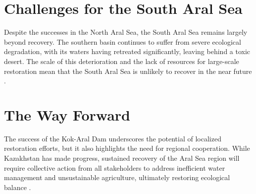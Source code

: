 \section{Challenges for the South Aral Sea}
Despite the successes in the North Aral Sea, the South Aral Sea remains largely beyond recovery. The southern basin continues to suffer from severe ecological degradation, with its waters having retreated significantly, leaving behind a toxic desert. The scale of this deterioration and the lack of resources for large-scale restoration mean that the South Aral Sea is unlikely to recover in the near future \autocite{chen2018aral}.

\section{The Way Forward}
The success of the Kok-Aral Dam underscores the potential of localized restoration efforts, but it also highlights the need for regional cooperation. While Kazakhstan has made progress, sustained recovery of the Aral Sea region will require collective action from all stakeholders to address inefficient water management and unsustainable agriculture, ultimately restoring ecological balance \autocite{dukhovny2003lessons}.